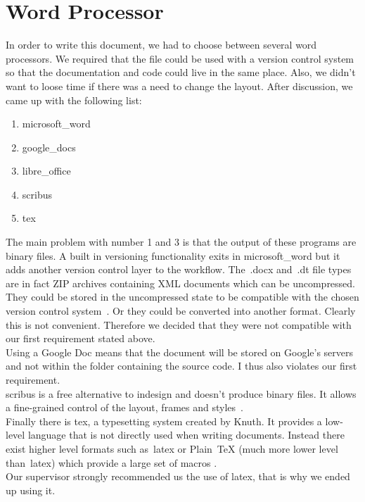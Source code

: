 \section{Word Processor}

In order to write this document, we had to choose between several word
processors. We required that the file could be used with a version control
system so that the documentation and code could live in the same place. Also,
we didn't want to loose time if there was a need to change the layout. After
discussion, we came up with the following list:

\begin{enumerate}
\item \Gls{microsoft_word}
\item \Gls{google_docs}
\item \Gls{libre_office}
\item \Gls{scribus}
\item \Gls{tex}
\end{enumerate}

The main problem with number 1 and 3 is that the output of these programs are 
binary files. A built in versioning functionality exits in \gls{microsoft_word}
but it adds another version control layer to the workflow. The~.docx and~.dt 
file types are in fact ZIP archives containing XML documents which can be 
uncompressed. They could be stored in the uncompressed state to be compatible
with the chosen version control system~\cite{zipdocextension}. Or they could 
be converted into another format. Clearly this is not convenient. Therefore we
decided that they were not compatible with our first requirement stated 
above.\\
Using a Google Doc means that the document will be stored on Google's servers 
and not within the folder containing the source code. I thus also violates our
first requirement.\\
\Gls{scribus} is a free alternative to \gls{indesign} and doesn't produce 
binary files. It allows a fine-grained control of the layout, frames and 
styles~\cite{ibm2013open}.\\
Finally there is \gls{tex}, a typesetting system created by Knuth. It provides 
a low-level language that is not directly used when writing documents. Instead 
there exist higher level formats such as~\gls{latex} or Plain~\TeX{} (much more
lower level than~\gls{latex}) which provide a large set of macros
\cite{levels2017}.\\ Our supervisor strongly recommended us the use of
\gls{latex}, that is why we ended up using it.
